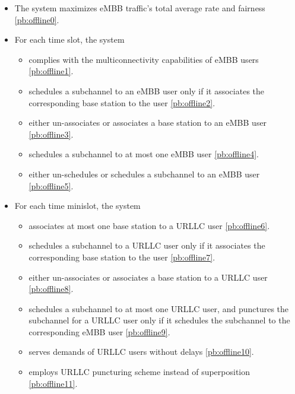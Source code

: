 \begin{frame}
  \begin{itemize}
    \item The system maximizes eMBB traffic's total average rate and fairness \eqref{pb:offline0}.
    \item For each time slot, the system
      \begin{itemize}
        \item complies with the multiconnectivity capabilities of eMBB users \eqref{pb:offline1}.
        \item schedules a subchannel to an eMBB user only if it associates the corresponding base station to the user \eqref{pb:offline2}.
        \item either un-associates or associates a base station to an eMBB user \eqref{pb:offline3}.
        \item schedules a subchannel to at most one eMBB user \eqref{pb:offline4}.
        \item either un-schedules or schedules a subchannel to an eMBB user \eqref{pb:offline5}.
      \end{itemize}
  \end{itemize}
\end{frame}

\begin{frame}
  \begin{itemize}
    \item For each time minislot, the system
      \begin{itemize}
        \item associates at most one base station to a URLLC user \eqref{pb:offline6}.
        \item schedules a subchannel to a URLLC user only if it associates the corresponding base station to the user \eqref{pb:offline7}.
        \item either un-associates or associates a base station to a URLLC user \eqref{pb:offline8}.
        \item schedules a subchannel to at most one URLLC user, and punctures the subchannel for a URLLC user only if it schedules the subchannel to the corresponding eMBB user \eqref{pb:offline9}\proofFootnote.
        \item serves demands of URLLC users without delays \eqref{pb:offline10}.
        \item employs URLLC puncturing scheme instead of superposition \eqref{pb:offline11}.
      \end{itemize}
  \end{itemize}
\end{frame}

